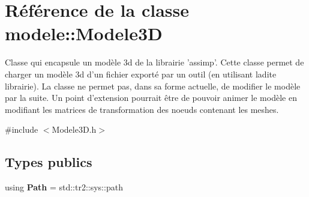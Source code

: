 \hypertarget{classmodele_1_1_modele3_d}{\section{Référence de la classe modele\-:\-:Modele3\-D}
\label{classmodele_1_1_modele3_d}
}


Classe qui encapsule un modèle 3d de la librairie 'assimp'. Cette classe permet de charger un modèle 3d d'un fichier exporté par un outil (en utilisant ladite librairie). La classe ne permet pas, dans sa forme actuelle, de modifier le modèle par la suite. Un point d'extension pourrait être de pouvoir animer le modèle en modifiant les matrices de transformation des noeuds contenant les meshes.  




{\ttfamily \#include $<$Modele3\-D.\-h$>$}

\subsection*{Types publics}
\begin{DoxyCompactItemize}
\item 
\hypertarget{classmodele_1_1_modele3_d_ab4241072ebd395ca1b9b6958ab8359cb}{using {\bfseries Path} = std\-::tr2\-::sys\-::path}\label{classmodele_1_1_modele3_d_ab4241072ebd395ca1b9b6958ab8359cb}

\end{DoxyCompactItemize}
